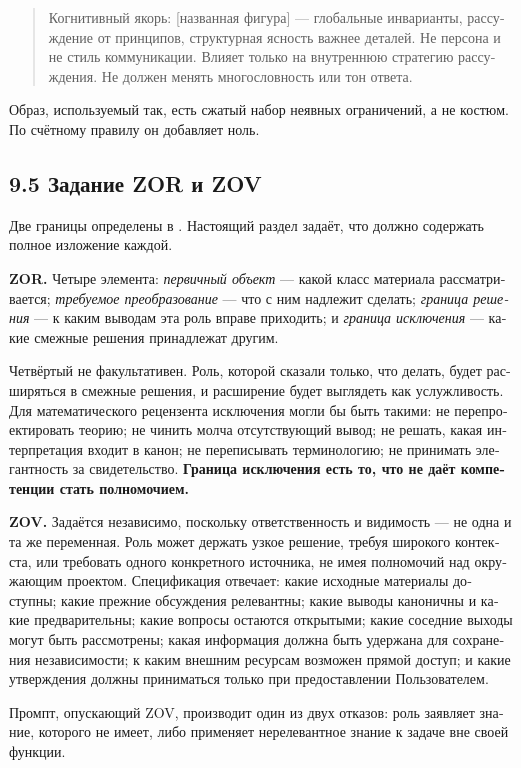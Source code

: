 \begin{russian}
\begin{quote}
Когнитивный якорь: [названная фигура] — глобальные инварианты, рассуждение от принципов, структурная ясность важнее деталей. Не персона и не стиль коммуникации. Влияет только на внутреннюю стратегию рассуждения. Не должен менять многословность или тон ответа.
\end{quote}
Образ, используемый так, есть сжатый набор неявных ограничений, а не костюм. По счётному правилу он добавляет ноль.


\subsection*{9.5 Задание ZOR и ZOV}
\label{sec:ru:9.5}

Две границы определены в . Настоящий раздел задаёт, что должно содержать полное изложение каждой.

\textbf{ZOR.} Четыре элемента: \emph{первичный объект} — какой класс материала рассматривается; \emph{требуемое преобразование} — что с ним надлежит сделать; \emph{граница решения} — к каким выводам эта роль вправе приходить; и \emph{граница исключения} — какие смежные решения принадлежат другим.

Четвёртый не факультативен. Роль, которой сказали только, что делать, будет расширяться в смежные решения, и расширение будет выглядеть как услужливость. Для математического рецензента исключения могли бы быть такими: не перепроектировать теорию; не чинить молча отсутствующий вывод; не решать, какая интерпретация входит в канон; не переписывать терминологию; не принимать элегантность за свидетельство. \textbf{Граница исключения есть то, что не даёт компетенции стать полномочием.}

\textbf{ZOV.} Задаётся независимо, поскольку ответственность и видимость — не одна и та же переменная. Роль может держать узкое решение, требуя широкого контекста, или требовать одного конкретного источника, не имея полномочий над окружающим проектом. Спецификация отвечает: какие исходные материалы доступны; какие прежние обсуждения релевантны; какие выводы каноничны и какие предварительны; какие вопросы остаются открытыми; какие соседние выходы могут быть рассмотрены; какая информация должна быть удержана для сохранения независимости; к каким внешним ресурсам возможен прямой доступ; и какие утверждения должны приниматься только при предоставлении Пользователем.

Промпт, опускающий ZOV, производит один из двух отказов: роль заявляет знание, которого не имеет, либо применяет нерелевантное знание к задаче вне своей функции.


\end{russian}

